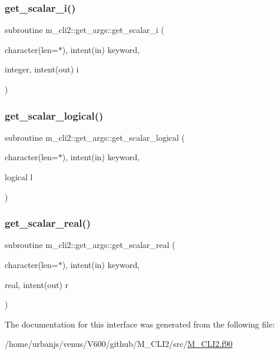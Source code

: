 \subsubsection{\texorpdfstring{get\+\_\+scalar\+\_\+i()}{get\_scalar\_i()}}
{\footnotesize\ttfamily subroutine m\+\_\+cli2\+::get\+\_\+args\+::get\+\_\+scalar\+\_\+i (\begin{DoxyParamCaption}\item[{character(len=$\ast$), intent(in)}]{keyword,  }\item[{integer, intent(out)}]{i }\end{DoxyParamCaption})\hspace{0.3cm}{\ttfamily [private]}}

\mbox{\label{interfacem__cli2_1_1get__args_a067f9a7dd7edb825afb728f069b3233e}} 
\subsubsection{\texorpdfstring{get\+\_\+scalar\+\_\+logical()}{get\_scalar\_logical()}}
{\footnotesize\ttfamily subroutine m\+\_\+cli2\+::get\+\_\+args\+::get\+\_\+scalar\+\_\+logical (\begin{DoxyParamCaption}\item[{character(len=$\ast$), intent(in)}]{keyword,  }\item[{logical}]{l }\end{DoxyParamCaption})\hspace{0.3cm}{\ttfamily [private]}}

\mbox{\label{interfacem__cli2_1_1get__args_aa6f39c9132687c0396d3b054bc5e47f6}} 
\subsubsection{\texorpdfstring{get\+\_\+scalar\+\_\+real()}{get\_scalar\_real()}}
{\footnotesize\ttfamily subroutine m\+\_\+cli2\+::get\+\_\+args\+::get\+\_\+scalar\+\_\+real (\begin{DoxyParamCaption}\item[{character(len=$\ast$), intent(in)}]{keyword,  }\item[{real, intent(out)}]{r }\end{DoxyParamCaption})\hspace{0.3cm}{\ttfamily [private]}}



The documentation for this interface was generated from the following file\+:\begin{DoxyCompactItemize}
\item 
/home/urbanjs/venus/\+V600/github/\+M\+\_\+\+C\+L\+I2/src/\mbox{\hyperlink{M__CLI2_8f90}{M\+\_\+\+C\+L\+I2.\+f90}}\end{DoxyCompactItemize}
